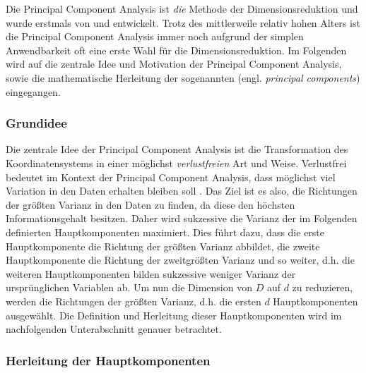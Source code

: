 Die Principal Component Analysis ist \textit{die} Methode der Dimensionsreduktion und wurde
erstmals von \textcite{Pearson.1901} und \textcite{Hotelling.1933} entwickelt. Trotz des
mittlerweile relativ hohen Alters ist die Principal Component Analysis immer noch aufgrund der
simplen Anwendbarkeit oft eine erste Wahl für die Dimensionsreduktion. Im Folgenden wird auf die
zentrale Idee und Motivation der Principal Component Analysis, sowie die mathematische Herleitung
der sogenannten  (engl. \textit{principal components}) eingegangen.

\subsubsection{Grundidee}
\label{ch:MethodenDerDimRed:statistisch:PCA:Grundidee}
Die zentrale Idee der Principal Component Analysis ist die Transformation des Koordinatensystems in einer möglichst \textit{verlustfreien} Art und Weise. Verlustfrei bedeutet im Kontext der Principal Component Analysis, dass möglichst viel Variation in den Daten erhalten bleiben soll \parencite[vgl.][1]{Jolliffe.2002}. Das Ziel ist es also, die Richtungen der größten Varianz in den
Daten zu finden, da diese den höchsten Informationsgehalt besitzen. Daher wird sukzessive die
Varianz der im Folgenden definierten Hauptkomponenten maximiert. Dies führt dazu, dass die erste
Hauptkomponente die Richtung der größten Varianz abbildet, die zweite Hauptkomponente die Richtung
der zweitgrößten Varianz und so weiter, d.h. die weiteren Hauptkomponenten bilden sukzessive
weniger Varianz der ursprünglichen Variablen ab. Um nun die Dimension von $D$ auf $d$ zu
reduzieren, werden die Richtungen der größten Varianz, d.h. die ersten $d$ Hauptkomponenten
ausgewählt. Die Definition und Herleitung dieser Hauptkomponenten wird im nachfolgenden
Unterabschnitt genauer betrachtet.

\subsubsection{Herleitung der Hauptkomponenten}
\label{ch:MethodenDerDimRed:statistisch:PCA:HerleitungPC}

